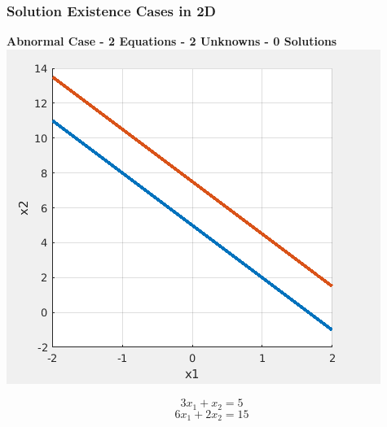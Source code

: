 \documentclass[fleqn]{beamer} %
\newcommand{\sectionIIIsubsectionIIItitle}{Solution Existence Cases in 2D}
\begin{document}
			\begin{frame}
				\frametitle{\sectionIIIsubsectionIIItitle}
				\bigskip

				{\bf Abnormal Case - 2 Equations - 2 Unknowns - 0 Solutions} \\ \vspace{2mm}
				\includegraphics[scale=.3]{images/lecture5_fig3.png} \\
				\begin{fleqn}
					\[3x_1+x_2=5\]
					\[6x_1+2x_2=15\]
				\end{fleqn}

				\btVFill
			\end{frame}
\end{document}
